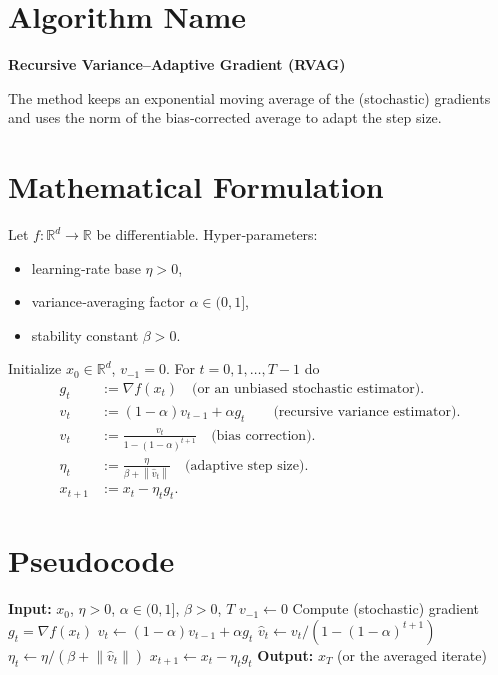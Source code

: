 \documentclass{article}
\newcommand{\norm}[1]{\left\lVert#1\right\rVert}
\begin{document}
\section*{Algorithm Name}
\textbf{Recursive Variance–Adaptive Gradient (RVAG)}  

The method keeps an exponential moving average of the (stochastic) gradients and uses the norm of the bias‑corrected average to adapt the step size.

\section*{Mathematical Formulation}
Let $f:\mathbb{R}^d\rightarrow\mathbb{R}$ be differentiable.  
Hyper‑parameters:
\begin{itemize}
    \item learning‑rate base $\eta>0$,
    \item variance‑averaging factor $\alpha\in(0,1]$,
    \item stability constant $\beta>0$.
\end{itemize}
Initialize $x_0\in\mathbb{R}^d$, $v_{-1}=0$. For $t=0,1,\dots,T-1$ do
\begin{align}
    g_t &:= \nabla f(x_t) \quad\text{(or an unbiased stochastic estimator).}\label{eq:gt}\\
    v_t &:= (1-\alpha)v_{t-1}+\alpha g_t \qquad\text{(recursive variance estimator).}\label{eq:vt}\\
    \hat v_t &:= \frac{v_t}{1-(1-\alpha)^{t+1}}\quad\text{(bias correction).}\label{eq:vtbias}\\
    \eta_t &:= \frac{\eta}{\beta+\norm{\hat v_t}}\quad\text{(adaptive step size).}\label{eq:etat}\\
    x_{t+1} &:= x_t-\eta_t g_t.\label{eq:update}
\end{align}

\section*{Pseudocode}
\begin{algorithm}[H]
\caption{Recursive Variance–Adaptive Gradient (RVAG)}
\begin{algorithmic}[1]
\State \textbf{Input:} $x_0$, $\eta>0$, $\alpha\in(0,1]$, $\beta>0$, $T$
\State $v_{-1}\gets 0$
    \State Compute (stochastic) gradient $g_t=\nabla f(x_t)$
    \State $v_t\gets (1-\alpha)v_{t-1}+\alpha g_t$
    \State $\hat v_t\gets v_t/(1-(1-\alpha)^{t+1})$ 
    \State $\eta_t\gets \eta/(\beta+\norm{\hat v_t})$
    \State $x_{t+1}\gets x_t-\eta_t g_t$
\EndFor
\State \textbf{Output:} $x_T$ (or the averaged iterate)
\end{algorithmic}
\end{algorithm}
\end{document}
